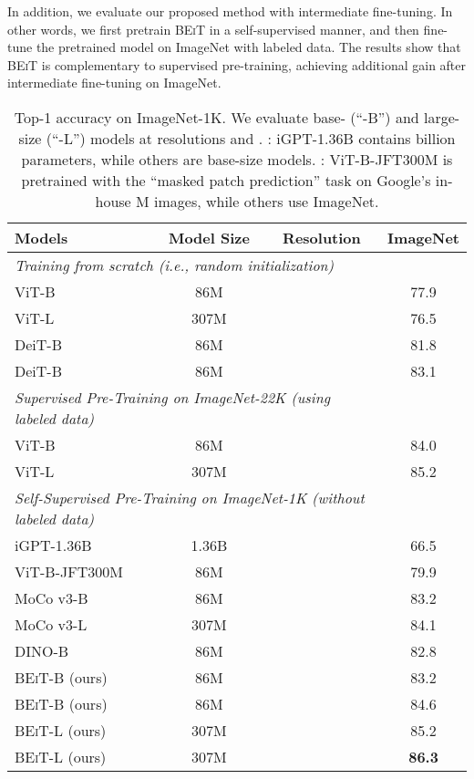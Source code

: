 \documentclass{article}
\newcommand\our{\textsc{BEiT}}
\begin{document}
In addition, we evaluate our proposed method with intermediate fine-tuning.
In other words, we first pretrain \our{} in a self-supervised manner, and then fine-tune the pretrained model on ImageNet with labeled data.
The results show that \our{} is complementary to supervised pre-training, achieving additional gain after intermediate fine-tuning on ImageNet.


\begin{table}[t]
\centering
\begin{tabular}{@{}lccc@{}}
\toprule
\bf Models & \bf Model Size & \bf Resolution & \bf ImageNet \\
\midrule
\multicolumn{3}{l}{\textit{Training from scratch (i.e., random initialization)}} \\
ViT-B~\citep{vit} & 86M &  & 77.9 \\
ViT-L~\citep{vit} & 307M &  & 76.5 \\
DeiT-B~\citep{deit}           & 86M &  &  81.8 \\
DeiT-B~\citep{deit}           & 86M &  &  83.1 \\
\midrule
\multicolumn{3}{l}{\textit{Supervised Pre-Training on ImageNet-22K (using labeled data)}} \\
ViT-B~\citep{vit} & 86M &   &  84.0 \\
ViT-L~\citep{vit}  & 307M &  & 85.2 \\
\midrule
\multicolumn{3}{l}{\textit{Self-Supervised Pre-Training on ImageNet-1K (without labeled data)}} \\
iGPT-1.36B~\citep{igpt} & 1.36B &  & 66.5 \\
ViT-B-JFT300M~\citep{vit} & 86M &  & 79.9 \\
MoCo v3-B~\citep{mocov3}       & 86M    &  &  83.2 \\
MoCo v3-L~\citep{mocov3}                              & 307M  &  & 84.1 \\
DINO-B~\citep{dino}       & 86M    &  &  82.8 \\
\our{}-B (ours)                                    & 86M &  & 83.2 \\
\our{}-B (ours)                                  & 86M  &  & 84.6 \\
\our{}-L (ours)                              & 307M  &  & 85.2 \\
\our{}-L (ours)                         & 307M  &  & \bf 86.3 \\
\bottomrule
\end{tabular}
\caption{Top-1 accuracy on ImageNet-1K.
We evaluate base- (``-B'') and large-size (``-L'') models at resolutions  and .
: iGPT-1.36B contains  billion parameters, while others are base-size models.
: ViT-B-JFT300M is pretrained with the ``masked patch prediction'' task on Google's in-house M images, while others use ImageNet.}
\label{tbl:results:cls:imagenet}
\end{table}
\end{document}
